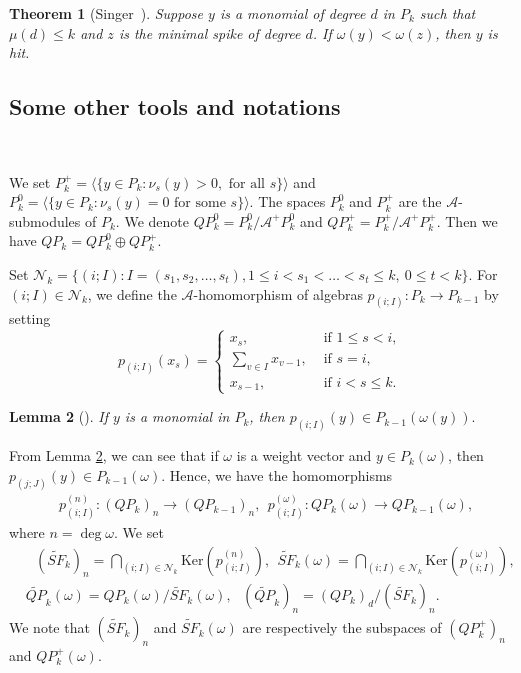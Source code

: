 \documentclass[reqno]{amsart}
\theoremstyle{plain}
\theoremstyle{definition}
\theoremstyle{plain}
\newtheorem{thms}{Theorem}[subsection]
\newtheorem{lems}[thms]{Lemma}
\theoremstyle{definition}
\numberwithin{equation}{section}
\begin{document}
\begin{thms}[Singer~{\cite{si2}}]\label{dlsig} Suppose $y$ is a monomial of degree $d$ in $P_k$ such that $\mu(d) \leqslant k$ and $z$ is the minimal spike of degree $d$. If $\omega(y) < \omega(z)$, then $y$ is hit. 
\end{thms}

\subsection{Some other tools and notations}\

\medskip
We set $P_k^+ = \langle\{y\in P_k :  \nu_s(y)>0, \mbox{ for all } s\}\rangle$ and $P_k^0 =\langle\{y\in P_k : \nu_s(y)=0 \mbox{ for some } s\}\rangle$. The spaces $P_k^0$ and $P_k^+$ are the $\mathcal{A}$-submodules of $P_k$. We denote $QP_k^0 = P_k^0/\mathcal A^+P_k^0$ and  $QP_k^+ = P_k^+/\mathcal A^+P_k^+$. Then we have $QP_k =QP_k^0 \oplus  QP_k^+.$


Set 
$\mathcal N_k =\{(i;I) : I=(s_1,s_2,\ldots,s_t),1 \leqslant  i < s_1 <  \ldots < s_t\leqslant  k,\ 0\leqslant t <k\}.$
For $(i;I) \in \mathcal N_k$, we define the $\mathcal A$-homomorphism of algebras $p_{(i;I)}: P_k \to P_{k-1}$  by setting
\begin{equation}\label{ct23}
p_{(i;I)}(x_s) =\begin{cases} x_s, &\mbox{ if } 1 \leqslant s < i,\\
\sum_{v\in I}x_{v-1}, &\mbox{ if }  s = i,\\  
x_{s-1},&\mbox{ if } i< s \leqslant k.
\end{cases}
\end{equation}

\begin{lems}[\cite{sp}]\label{bdm} If $y$ is a monomial in $P_k$, then $p_{(i;I)}(y) \in P_{k-1}(\omega(y)).$
\end{lems}

From Lemma \ref{bdm}, we can see that if $\omega$ is a weight vector and $y \in P_k(\omega)$, then $p_{(j;J)}(y) \in P_{k-1}(\omega)$. Hence, we have the homomorphisms  
\begin{align*}
&p_{(i;I)}^{(n)} :(QP_k)_n\longrightarrow (QP_{k-1})_n,\ \ p_{(i;I)}^{(\omega)} :QP_k(\omega)\longrightarrow QP_{k-1}(\omega),
\end{align*} 
where $n = \deg\omega$. We set 
\begin{align*}
&\mbox{  } (\widetilde {SF}_k)_n = \bigcap_{(i;I)\in \mathcal N_k}  \mbox{Ker}(p_{(i;I)}^{(n)}),\ \ \widetilde {SF}_k(\omega) = \bigcap_{(i;I)\in \mathcal N_k}  \mbox{Ker}(p_{(i;I)}^{(\omega)}),\\
&\widetilde{QP}_k(\omega) = QP_k(\omega)/\widetilde {SF}_k(\omega), \mbox{ } (\widetilde{QP}_k)_n = (QP_k)_d/(\widetilde {SF}_k)_n.
\end{align*}
We note that $(\widetilde {SF}_k)_n$ and $\widetilde {SF}_k(\omega)$ are respectively the subspaces of $(QP_k^+)_n$ and $QP_k^+(\omega)$.
\end{document}
